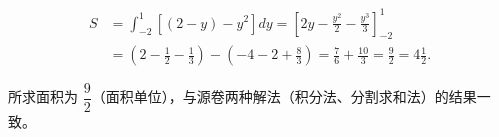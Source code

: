 \begin{answer}
\nopagebreak[4]
\[
\begin{aligned}
S&=\int_{-2}^{1}\left[(2-y)-y^2\right]dy
=\left[2y-\frac{y^2}{2}-\frac{y^3}{3}\right]_{-2}^{1}\\
&=\left(2-\frac12-\frac13\right)-\left(-4-2+\frac83\right)
=\frac76+\frac{10}{3}=\frac92=4\frac12.
\end{aligned}
\]

所求面积为 $\dfrac92$（面积单位），与源卷两种解法（积分法、分割求和法）的结果一致。


\end{answer}
